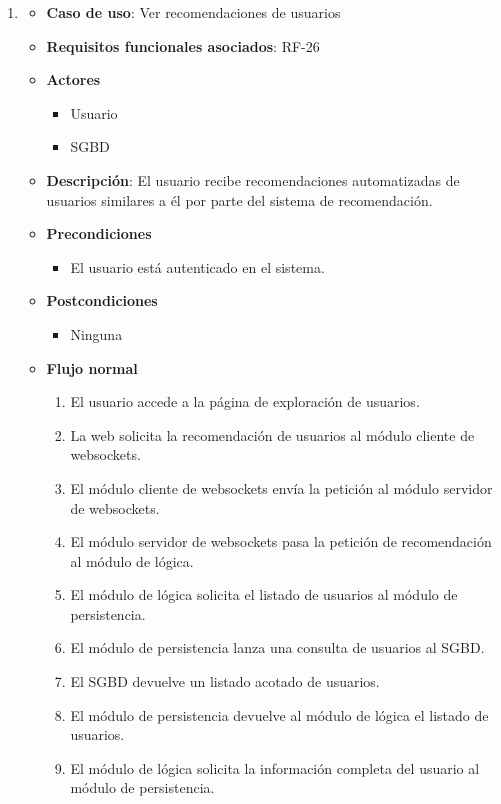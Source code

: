 \begin{enumerate}
\item %
  \begin{itemize}
  \item \textbf{Caso de uso}: Ver recomendaciones de usuarios
  \item \textbf{Requisitos funcionales asociados}: RF-26
  \item \textbf{Actores}
    \begin{itemize}
    \item Usuario
    \item SGBD
    \end{itemize}
  \item \textbf{Descripción}: El usuario recibe recomendaciones automatizadas de usuarios similares a él por parte del sistema de recomendación.
  \item \textbf{Precondiciones}
    \begin{itemize}
    \item El usuario está autenticado en el sistema.
    \end{itemize}
  \item \textbf{Postcondiciones}
    \begin{itemize}
    \item Ninguna
    \end{itemize}
  \item \textbf{Flujo normal}
    \begin{enumerate}
    \item El usuario accede a la página de exploración de usuarios.
    \item La web solicita la recomendación de usuarios al módulo cliente de websockets.
    \item El módulo cliente de websockets envía la petición al módulo servidor de websockets.
    \item El módulo servidor de websockets pasa la petición de recomendación al módulo de lógica.
    \item El módulo de lógica solicita el listado de usuarios al módulo de persistencia.
    \item El módulo de persistencia lanza una consulta de usuarios al SGBD.
    \item El SGBD devuelve un listado acotado de usuarios.
    \item El módulo de persistencia devuelve al módulo de lógica el listado de usuarios.
    \item El módulo de lógica solicita la información completa del usuario al módulo de persistencia.

\end{enumerate}
\end{itemize}
\end{enumerate}
